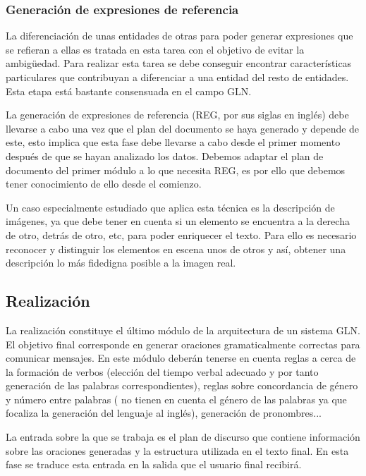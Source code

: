 \subsubsection{Generación de expresiones de referencia}
La diferenciación de unas entidades de otras para poder generar expresiones que se refieran a ellas es tratada en esta tarea con el objetivo de evitar la ambigüedad. Para realizar esta tarea se debe conseguir encontrar características particulares que contribuyan a diferenciar a una entidad del resto de entidades. Esta etapa está bastante consensuada en el campo GLN. 

La generación de expresiones de referencia (REG, por sus siglas en inglés) debe llevarse a cabo una vez que el plan del documento se haya generado y depende de este, esto implica que esta fase debe llevarse a cabo desde el primer momento después de que se hayan analizado los datos. Debemos adaptar el plan de documento del primer módulo a lo que necesita REG, es por ello que debemos tener conocimiento de ello desde el comienzo.

Un caso especialmente estudiado que aplica esta técnica es la descripción de imágenes, ya que debe tener en cuenta si un elemento se encuentra a la derecha de otro, detrás de otro, etc, para poder enriquecer el texto. Para ello es necesario reconocer y distinguir los elementos en escena unos de otros y así, obtener una descripción lo más fidedigna posible a la imagen real.

\subsection{Realización}
La realización constituye el último módulo de la arquitectura de un sistema GLN. El objetivo final corresponde en generar oraciones gramaticalmente correctas para comunicar mensajes. En este módulo deberán tenerse en cuenta reglas a cerca de la formación de verbos (elección del tiempo verbal adecuado y por tanto generación de las palabras correspondientes), reglas sobre concordancia de género y número entre palabras (\cite{reiter1997building} no tienen en cuenta el género de las palabras ya que focaliza la generación del lenguaje al inglés), generación de pronombres...
 
La entrada sobre la que se trabaja es el plan de discurso que contiene información sobre las oraciones generadas y la estructura utilizada en el texto final. En esta fase se traduce esta entrada en la salida que el usuario final recibirá.

